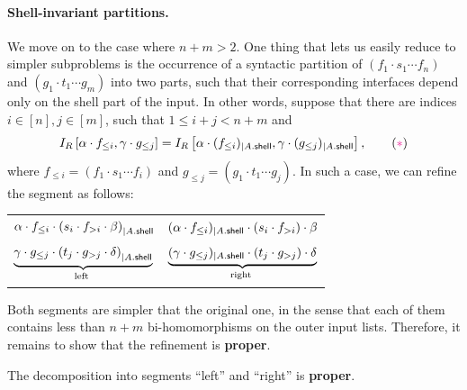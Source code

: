 \paragraph{Shell-invariant partitions.} We move on to the case where $n + m > 2$. One thing that lets us easily reduce to simpler subproblems is the occurrence of a syntactic partition of $(f_1 \cdot s_1 \cdots f_n)$ and $(g_1 \cdot t_1 \cdots g_m)$ into two parts, such that their corresponding interfaces depend only on the shell part of the input. In other words, suppose that there are indices $i \in [n], j \in [m]$, such that $1 \leq i+j < n + m$ and
\[
    \rint{\alpha \cdot f_{\leq i}}{\gamma \cdot g_{\leq j}} = \rint{\alpha \cdot (f_{\leq i})_{| \shell{A}}}{\gamma \cdot (g_{\leq j})_{| \shell{A}}}, \tag{{\color{magenta}$*$}}\label{eq:shell-invariant-partitions-right-interfaces}
\]
where $f_{\leq i} = (f_1 \cdot s_1 \cdots f_i)$ and $g_{\leq j} = (g_1 \cdot t_1 \cdots g_j)$. In such a case, we can refine the segment as follows:

\begin{center}
    \begin{tabular}{l|l}
        $\alpha \cdot f_{\leq i} \cdot \left( s_i \cdot f_{>i} \cdot \beta \right)_{| A . \mathsf{shell}}$ & $(\alpha \cdot f_{\leq i})_{| A . \mathsf{shell}} \cdot (s_i \cdot f_{> i}) \cdot \beta$ \\
        $\myunderbrace{\gamma \cdot g_{\leq j} \cdot \left( t_j \cdot g_{>j} \cdot \delta \right)_{| \shell{A}}}{\text{left}}$ & $\myunderbrace{(\gamma \cdot g_{\leq j})_{| \shell{A}} \cdot (t_j \cdot g_{>j}) \cdot \delta}{\text{right}}$
    \end{tabular}
\end{center}

Both segments are simpler that the original one, in the sense that each of them contains less than $n + m$ bi-homomorphisms on the outer input lists. Therefore, it remains to show that the refinement is \textbf{proper}.

\begin{claim}
    The decomposition into segments ``left'' and ``right'' is \textbf{proper}.
\end{claim}

